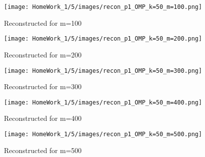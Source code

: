 \documentclass{article}
\begin{document}
\begin{figure}[h!]
    \centering
    \begin{minipage}{0.1\textwidth}
        \texttt{[image: HomeWork\_1/5/images/recon\_p1\_OMP\_k=50\_m=100.png]}
        \caption{Reconstructed for m=100}
    \end{minipage}
    \hspace{0.5cm}
    \begin{minipage}{0.1\textwidth}
        \centering
        \texttt{[image: HomeWork\_1/5/images/recon\_p1\_OMP\_k=50\_m=200.png]}
        \caption{Reconstructed for m=200}
    \end{minipage}
    \hspace{0.5cm}
    \begin{minipage}{0.1\textwidth}
        \centering
        \texttt{[image: HomeWork\_1/5/images/recon\_p1\_OMP\_k=50\_m=300.png]}
        \caption{Reconstructed for m=300}
    \end{minipage}
    \hspace{0.5cm}
    \begin{minipage}{0.1\textwidth}
        \centering
        \texttt{[image: HomeWork\_1/5/images/recon\_p1\_OMP\_k=50\_m=400.png]}
        \caption{Reconstructed for m=400}
    \end{minipage}
    \hspace{0.5cm}
    \begin{minipage}{0.1\textwidth}
        \centering
        \texttt{[image: HomeWork\_1/5/images/recon\_p1\_OMP\_k=50\_m=500.png]}
        \caption{Reconstructed for m=500}
    \end{minipage}

    \vspace{1cm} %


\end{figure}
\end{document}

